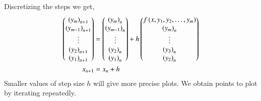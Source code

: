 \documentclass[journal]{IEEEtran}
\begin{document}
Discretizing the steps we get,
\begin{align}
    \begin{pmatrix}\left(y_{m}\right)_{n+1} \\ \left(y_{m-1}\right)_{n+1} \\ \vdots \\ \left(y_2\right)_{n+1} \\ \left(y_1\right)_{n+1}\end{pmatrix}&=\begin{pmatrix}\left(y_{m}\right)_n \\ \left(y_{m-1}\right)_n \\ \vdots \\ \left(y_2\right)_n \\ \left(y_1\right)_n\end{pmatrix}+h\begin{pmatrix}f\left(x, y_1, y_2, \dots, y_m\right) \\ \left(y_{m}\right)_n \\ \vdots \\ \left(y_3\right)_n \\ \left(y_2\right)_n\end{pmatrix}\\
    x_{n+1}&=x_n+h
\end{align}
Smaller values of step size $h$ will give more precise plots. We obtain points to plot by iterating repeatedly. 
\end{document}
